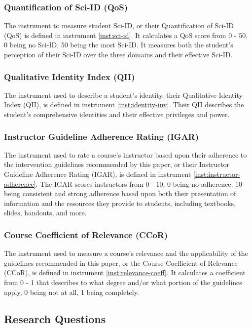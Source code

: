 \documentclass[10pt, twocolumn]{article}
\begin{document}
        \subsubsection{Quantification of Sci-ID (QoS)}
            The instrument to measure student Sci-ID, or their Quantification of Sci-ID (QoS) is defined in instrument \ref{inst:sci-id}. It calculates a QoS score from 0 - 50, 0 being no Sci-ID, 50 being the most Sci-ID. It measures both the student's perception of their Sci-ID over the three domains and their effective Sci-ID.

        \subsubsection{Qualitative Identity Index (QII)}
            The instrument used to describe a student's identity, their Qualitative Identity Index (QII), is defined in instrument \ref{inst:identity-inv}. Their QII describes the student's comprehensive identities and their effective privileges and power.

        \subsubsection{Instructor Guideline Adherence Rating (IGAR)}
            The instrument used to rate a course's instructor based upon their adherence to the intervention guidelines recommended by this paper, or their Instructor Guideline Adherence Rating (IGAR), is defined in instrument \ref{inst:instructor-adherence}. The IGAR scores instructors from 0 - 10, 0 being no adherence, 10 being consistent and strong adherence based upon both their presentation of information and the resources they provide to students, including textbooks, slides, handouts, and more.
        
        \subsubsection{Course Coefficient of Relevance (CCoR)}
            The instrument used to measure a course's relevance and the applicability of the guidelines recommended in this paper, or the Course Coefficient of Relevance (CCoR), is defined in instrument \ref{inst:relevance-coeff}. It calculates a coefficient from 0 - 1 that describes to what degree and/or what portion of the guidelines apply, 0 being not at all, 1 being completely.
    
    \subsection{Research Questions}
\end{document}
